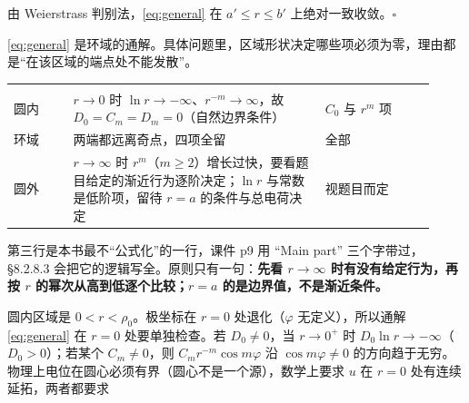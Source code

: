 由 Weierstrass 判别法，\eqref{eq:general} 在 $a'\le r\le b'$ 上绝对一致收敛。$\square$



\eqref{eq:general} 是环域的通解。具体问题里，区域形状决定哪些项必须为零，理由都是“在该区域的端点处不能发散”。

\needspace{0.30\textheight}
\begin{center}
\tabtop
\begin{tabular}{@{}L{0.13\linewidth}L{0.55\linewidth}L{0.24\linewidth}@{}}
 &  &  \\
\tabmidrule
圆内 & $r\to0$ 时 $\ln r\to-\infty$、$r^{-m}\to\infty$，故 $D_0=C_m=D_m=0$（自然边界条件） & $C_0$ 与 $r^m$ 项 \\
环域 & 两端都远离奇点，四项全留 & 全部 \\
圆外 & $r\to\infty$ 时 $r^m$（$m\ge2$）增长过快，要看题目给定的渐近行为逐阶决定；$\ln r$ 与常数是低阶项，留待 $r=a$ 的条件与总电荷决定 & 视题目而定 \\
\end{tabular}
\tabbot
\end{center}

第三行是本书最不“公式化”的一行，课件 p9 用 “Main part” 三个字带过，\S8.2.8.3 会把它的逻辑写全。原则只有一句：\textbf{先看 $r\to\infty$ 时有没有给定行为，再按 $r$ 的幂次从高到低逐个比较；$r=a$ 的是边界值，不是渐近条件。}


\label{sec:826}



圆内区域是 $0<r<\rho_0$。极坐标在 $r=0$ 处退化（$\varphi$ 无定义），所以通解 \eqref{eq:general} 在 $r=0$ 处要单独检查。若 $D_0\ne0$，当 $r\to0^+$ 时 $D_0\ln r\to-\infty$（$D_0>0$）；若某个 $C_m\ne0$，则 $C_mr^{-m}\cos m\varphi$ 沿 $\cos m\varphi\ne0$ 的方向趋于无穷。物理上电位在圆心必须有界（圆心不是一个源），数学上要求 $u$ 在 $r=0$ 处有连续延拓，两者都要求

